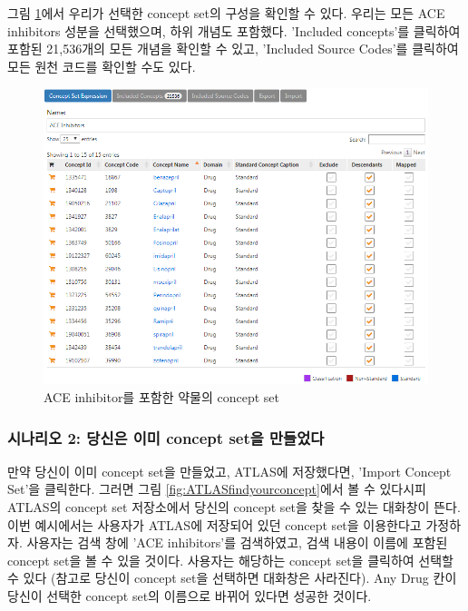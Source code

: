 \documentclass[10.5pt]{book}
\theoremstyle{definition}
\theoremstyle{definition}
\theoremstyle{definition}
\theoremstyle{remark}
\begin{document}
그림 \ref{fig:aceConceptSetExpression}에서 우리가 선택한 concept set의
구성을 확인할 수 있다. 우리는 모든 ACE inhibitors 성분을 선택했으며,
하위 개념도 포함했다. 'Included concepts'를 클릭하여 포함된 21,536개의
모든 개념을 확인할 수 있고, 'Included Source Codes'를 클릭하여 모든 원천
코드를 확인할 수도 있다.

\begin{figure}

{\centering \includegraphics[width=1\linewidth]{images/Cohorts/aceConceptSetExpression} 

}

\caption{ACE inhibitor를 포함한 약물의 concept set}\label{fig:aceConceptSetExpression}
\end{figure}

\subsubsection*{시나리오 2: 당신은 이미 concept set을
만들었다}\label{-2---concept-set-}

만약 당신이 이미 concept set을 만들었고, ATLAS에 저장했다면, 'Import
Concept Set'을 클릭한다. 그러면 그림 \ref{fig:ATLASfindyourconcept}에서
볼 수 있다시피 ATLAS의 concept set 저장소에서 당신의 concept set을 찾을
수 있는 대화창이 뜬다. 이번 예시에서는 사용자가 ATLAS에 저장되어 있던
concept set을 이용한다고 가정하자. 사용자는 검색 창에 'ACE inhibitors'를
검색하였고, 검색 내용이 이름에 포함된 concept set을 볼 수 있을 것이다.
사용자는 해당하는 concept set을 클릭하여 선택할 수 있다 (참고로 당신이
concept set을 선택하면 대화창은 사라진다). Any Drug 칸이 당신이 선택한
concept set의 이름으로 바뀌어 있다면 성공한 것이다.
\end{document}
